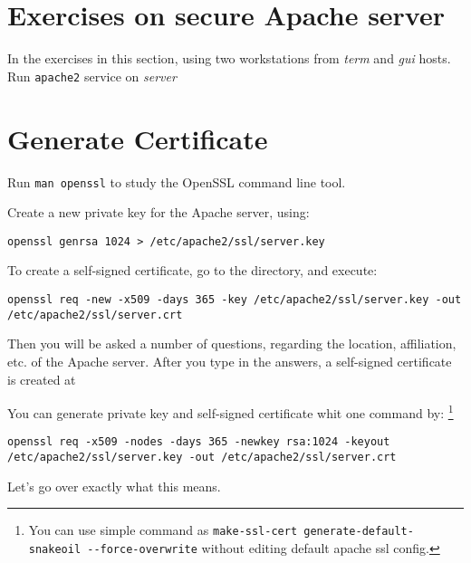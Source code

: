 \documentclass{../UTNetLab}
\begin{document}
\section*{Exercises on secure Apache server}
    In the exercises in this section, using two workstations from \textit{term} and \textit{gui} hosts. Run \lstinline{apache2} service on \textit{server}

\section{Generate Certificate}
    Run \lstinline{man openssl} to study the OpenSSL command line tool.

    Create a new private key for the Apache server, using:
    \begin{lstlisting}
openssl genrsa 1024 > /etc/apache2/ssl/server.key
    \end{lstlisting}
    To create a self-signed certificate, go to the  directory, and execute:
    \begin{lstlisting}
openssl req -new -x509 -days 365 -key /etc/apache2/ssl/server.key -out /etc/apache2/ssl/server.crt
    \end{lstlisting}
    Then you will be asked a number of questions, regarding the location, affiliation, etc. of the Apache server. After you type in the answers, a self-signed certificate is created at 

    You can generate private key and self-signed certificate whit one command by:
    \footnote{You can use simple command as \lstinline{make-ssl-cert generate-default-snakeoil --force-overwrite} without editing default apache ssl config.}
    \begin{lstlisting}
openssl req -x509 -nodes -days 365 -newkey rsa:1024 -keyout /etc/apache2/ssl/server.key -out /etc/apache2/ssl/server.crt
    \end{lstlisting}

        Let's go over exactly what this means.
\end{document}
